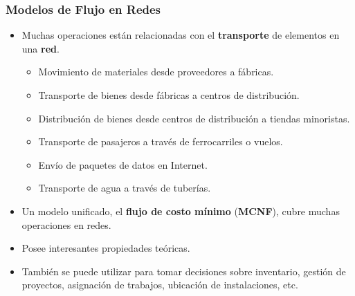\documentclass{beamer}
\begin{document}
\begin{frame}
    \frametitle{Modelos de Flujo en Redes}
    
    \begin{itemize}
        \item Muchas operaciones están relacionadas con el \textbf{transporte} de elementos en una \textbf{red}.
        \begin{itemize}
            \item Movimiento de materiales desde proveedores a fábricas.
            \item Transporte de bienes desde fábricas a centros de distribución.
            \item Distribución de bienes desde centros de distribución a tiendas minoristas.
            \item Transporte de pasajeros a través de ferrocarriles o vuelos.
            \item Envío de paquetes de datos en Internet.
            \item Transporte de agua a través de tuberías.
        \end{itemize}
        \item Un modelo unificado, el \textbf{flujo de costo mínimo} (\textbf{MCNF}), cubre muchas operaciones en redes.
        \item Posee interesantes propiedades teóricas.
        \item También se puede utilizar para tomar decisiones sobre inventario, gestión de proyectos, asignación de trabajos, ubicación de instalaciones, etc.
    \end{itemize}

\end{frame}
\end{document}
